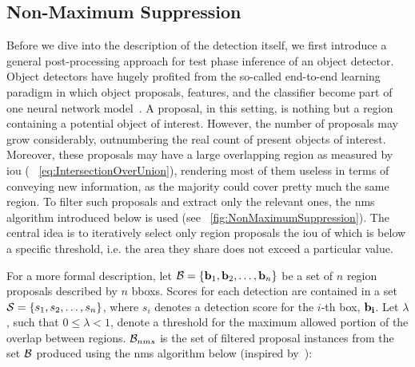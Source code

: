 \subsection{Non-Maximum Suppression}
\label{ssec:NonMaximumSuppression}

Before we dive into the description of the detection itself, we first introduce a general post-processing approach for test phase inference of an object detector. Object detectors have hugely profited from the so-called end-to-end learning paradigm in which object proposals, features, and the classifier become part of one neural network model~\cite{hosang2017learningnms}. A proposal, in this setting, is nothing but a region containing a potential object of interest. However, the number of proposals may grow considerably, outnumbering the real count of present objects of interest. Moreover, these proposals may have a large overlapping region as measured by \gls{iou} ( \sectionstr{}~\ref{eq:IntersectionOverUnion}), rendering most of them useless in terms of conveying new information, as the majority could cover pretty much the same region. To filter such proposals and extract only the relevant ones, the \gls{nms} algorithm introduced below is used (see \figstr{}~\ref{fig:NonMaximumSuppression}). The central idea is to iteratively select only region proposals the \gls{iou} of which is below a specific threshold, i.e. the area they share does not exceed a particular value.

For a more formal description, let $\mathcal{B} = \left\{ {\mathbf{b}_1, \mathbf{b}_2, \dots, \mathbf{b}_n} \right\}$ be a set of $n$ region proposals described by $n$ \glspl{bbox}. Scores for each detection are contained in a set $\mathcal{S} = \left\{ {s_1, s_2, \dots, s_n} \right\}$, where $s_i$ denotes a detection score for the $i$-th box, $\mathbf{b_i}$. Let $\lambda$, such that $0 \leq \lambda < 1$, denote a threshold for the maximum allowed portion of the overlap between regions. $\mathcal{B}_{nms}$ is the set of filtered proposal instances from the set $\mathcal{B}$ produced using the \gls{nms} algorithm below (inspired by~\cite{bodla2017softnms}):

